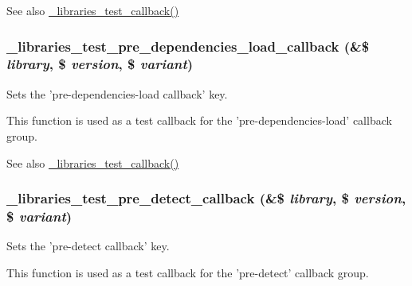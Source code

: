 \begin{DoxySeeAlso}{See also}
\hyperlink{libraries__test_8module_a4ecb0be495ba6a434403bc89961cbb8d}{\_\-libraries\_\-test\_\-callback()} 
\end{DoxySeeAlso}
\hypertarget{libraries__test_8module_acf93be0f4acdd042e96854daefdc078d}{
\subsubsection[{\_\-libraries\_\-test\_\-pre\_\-dependencies\_\-load\_\-callback}]{\setlength{\rightskip}{0pt plus 5cm}\_\-libraries\_\-test\_\-pre\_\-dependencies\_\-load\_\-callback (\&\$ {\em library}, \/  \$ {\em version}, \/  \$ {\em variant})}}
\label{libraries__test_8module_acf93be0f4acdd042e96854daefdc078d}
Sets the 'pre-\/dependencies-\/load callback' key.

This function is used as a test callback for the 'pre-\/dependencies-\/load' callback group.

\begin{DoxySeeAlso}{See also}
\hyperlink{libraries__test_8module_a4ecb0be495ba6a434403bc89961cbb8d}{\_\-libraries\_\-test\_\-callback()} 
\end{DoxySeeAlso}
\hypertarget{libraries__test_8module_ae1c8a142c12a8511ee7c915d99e401e7}{
\subsubsection[{\_\-libraries\_\-test\_\-pre\_\-detect\_\-callback}]{\setlength{\rightskip}{0pt plus 5cm}\_\-libraries\_\-test\_\-pre\_\-detect\_\-callback (\&\$ {\em library}, \/  \$ {\em version}, \/  \$ {\em variant})}}
\label{libraries__test_8module_ae1c8a142c12a8511ee7c915d99e401e7}
Sets the 'pre-\/detect callback' key.

This function is used as a test callback for the 'pre-\/detect' callback group.

